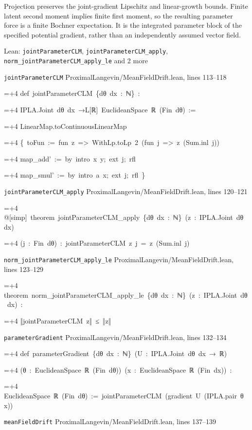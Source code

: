 \documentclass[11pt,a4paper]{article}
\newlength{\leancharwidth}
\newenvironment{leancode}{\par\smallskip\begingroup\ttfamily\footnotesize\raggedright
  \settowidth{\leancharwidth}{M}\setlength{\parskip}{0pt}\setlength{\parindent}{0pt}
  \frenchspacing}{\par\endgroup\smallskip}
\newcommand{\leanline}[2]{\hangindent=\dimexpr#1\leancharwidth+4\leancharwidth\relax
  \hangafter=1\noindent\hspace*{#1\leancharwidth}#2\par}
\newcommand{\leansource}[1]{\par{\footnotesize\color{leanmuted}#1}\par}
\begin{document}
Projection preserves the joint-gradient Lipschitz and linear-growth bounds. Finite latent second moment implies finite first moment, so the resulting parameter force is a finite Bochner expectation. It is the integrated parameter block of the specified potential gradient, rather than an independently assumed vector field.

\begin{leanbox}{Lean: \texttt{jointParameterCLM}, \texttt{jointParameterCLM\_\allowbreak{}apply}, \texttt{norm\_\allowbreak{}jointParameterCLM\_\allowbreak{}apply\_\allowbreak{}le} and 2 more}
\leansource{\texttt{jointParameterCLM} \quad ProximalLangevin/\allowbreak{}MeanFieldDrift.lean, lines 113–118}
\begin{leancode}
\leanline{0}{def\ jointParameterCLM\ \{dθ\ dx\ :\ ℕ\}\ :}
\leanline{4}{IPLA.Joint\ dθ\ dx\ →L[ℝ]\ EuclideanSpace\ ℝ\ (Fin\ dθ)\ :=}
\leanline{2}{LinearMap.toContinuousLinearMap}
\leanline{4}{\{\ toFun\ :=\ fun\ z\ =>\ WithLp.toLp\ 2\ (fun\ j\ =>\ z\ (Sum.inl\ j))}
\leanline{6}{map\_add'\ :=\ by\ intro\ x\ y;\ ext\ j;\ rfl}
\leanline{6}{map\_smul'\ :=\ by\ intro\ a\ x;\ ext\ j;\ rfl\ \}}
\end{leancode}
\leansource{\texttt{jointParameterCLM\_\allowbreak{}apply} \quad ProximalLangevin/\allowbreak{}MeanFieldDrift.lean, lines 120–121}
\begin{leancode}
\leanline{0}{@[simp]\ theorem\ jointParameterCLM\_apply\ \{dθ\ dx\ :\ ℕ\}\ (z\ :\ IPLA.Joint\ dθ\ dx)}
\leanline{4}{(j\ :\ Fin\ dθ)\ :\ jointParameterCLM\ z\ j\ =\ z\ (Sum.inl\ j)}
\end{leancode}
\leansource{\texttt{norm\_\allowbreak{}jointParameterCLM\_\allowbreak{}apply\_\allowbreak{}le} \quad ProximalLangevin/\allowbreak{}MeanFieldDrift.lean, lines 123–129}
\begin{leancode}
\leanline{0}{theorem\ norm\_jointParameterCLM\_apply\_le\ \{dθ\ dx\ :\ ℕ\}\ (z\ :\ IPLA.Joint\ dθ\ dx)\ :}
\leanline{4}{‖jointParameterCLM\ z‖\ ≤\ ‖z‖}
\end{leancode}
\leansource{\texttt{parameterGradient} \quad ProximalLangevin/\allowbreak{}MeanFieldDrift.lean, lines 132–134}
\begin{leancode}
\leanline{0}{def\ parameterGradient\ \{dθ\ dx\ :\ ℕ\}\ (U\ :\ IPLA.Joint\ dθ\ dx\ →\ ℝ)}
\leanline{4}{(θ\ :\ EuclideanSpace\ ℝ\ (Fin\ dθ))\ (x\ :\ EuclideanSpace\ ℝ\ (Fin\ dx))\ :}
\leanline{4}{EuclideanSpace\ ℝ\ (Fin\ dθ)\ :=\ jointParameterCLM\ (gradient\ U\ (IPLA.pair\ θ\ x))}
\end{leancode}
\leansource{\texttt{meanFieldDrift} \quad ProximalLangevin/\allowbreak{}MeanFieldDrift.lean, lines 137–139}

\end{leanbox}
\end{document}
